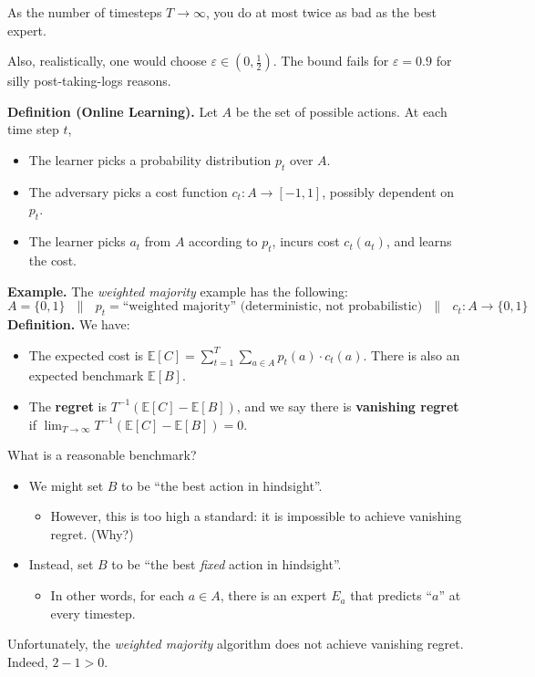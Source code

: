 \begin{remark}
    As the number of timesteps $T \to \infty$, you do at most twice as bad as the best expert.

    Also, realistically, one would choose $\varepsilon \in (0, \frac{1}{2})$.  The bound fails for $\varepsilon = 0.9$ for silly post-taking-logs reasons.
\end{remark}

\textbf{Definition (Online Learning).} Let $A$ be the set of possible actions.  At each time step $t$,
\begin{itemize}
    \item The learner picks a probability distribution $p_t$ over $A$.
    \item The adversary picks a cost function $c_t: A \to [-1, 1]$, possibly dependent on $p_t$.
    \item The learner picks $a_t$ from $A$ according to $p_t$, incurs cost $c_t(a_t)$, and learns the cost.
\end{itemize}

\textbf{Example.} The \emph{weighted majority} example has the following:
\[ A = \{0, 1\} ~~~ \parallel ~~~ p_t = \text{``weighted majority'' (deterministic, not probabilistic)} ~~~ \parallel ~~~ c_t : A \to \{0, 1\} \]
\textbf{Definition.} We have:
\begin{itemize}
    \item The expected cost is $\mathbb{E}[C] = \sum_{t = 1}^T \sum_{a \in A} p_t(a) \cdot c_t(a)$.  There is also an expected benchmark $\mathbb{E}[B]$.
    \item The \textbf{regret} is $T^{-1} (\mathbb{E}[C] - \mathbb{E}[B])$, and we say there is \textbf{vanishing regret} if $\displaystyle\lim_{T \to \infty} T^{-1} (\mathbb{E}[C] - \mathbb{E}[B]) = 0$.
\end{itemize}

What is a reasonable benchmark?
\begin{itemize}
    \item We might set $B$ to be ``the best action in hindsight''.
    \begin{itemize}
        \item However, this is too high a standard: it is impossible to achieve vanishing regret.  (Why?)
    \end{itemize}
    \item Instead, set $B$ to be ``the best \emph{fixed} action in hindsight''.
    \begin{itemize}
        \item In other words, for each $a \in A$, there is an expert $E_a$ that predicts ``$a$'' at every timestep.
    \end{itemize}
\end{itemize}
Unfortunately, the \emph{weighted majority} algorithm does not achieve vanishing regret.  Indeed, $2 - 1 > 0$.


